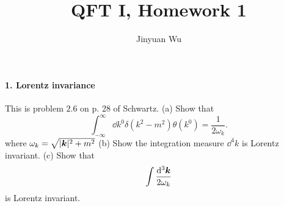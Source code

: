 \documentclass[hyperref, a4paper]{article}
\title{QFT I, Homework 1}
\author{Jinyuan Wu}
\begin{document}
\maketitle

\paragraph{1. Lorentz invariance} This is problem $2.6$ on p. 28 of Schwartz.
(a) Show that
\begin{equation}
    \int_{-\infty}^{\infty} \dd k^{0} \delta\left(k^{2}-m^{2}\right) \theta\left(k^{0}\right)=\frac{1}{2 \omega_{k}}.
    \label{eq:sch-2.6-1}
\end{equation}
where $\omega_{k}=\sqrt{|\vb*{k}|^{2}+m^{2}}$
(b) Show the integration measure $\dd^{4} k$ is Lorentz invariant.
(c) Show that
\[
\int \frac{\dd^{3} \vb*{k}}{2 \omega_{k}}
\]
is Lorentz invariant.
\end{document}
